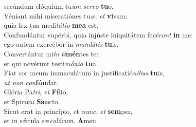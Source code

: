 \evenverse secúndum elóquium tu\textit{um} \textit{ser}\textit{vo} \textbf{tu}o.\\
\oddverse Véniant mihi miseratiónes tu\textit{æ}, \textit{et} \textbf{vi}vam:~\*\\
\oddverse quia lex tua medi\textit{tá}\textit{ti}\textit{o} \textbf{me}\textbf{a} est.\\
\evenverse Confundántur supérbi, quia injúste iniquitátem fe\textit{cé}\textit{runt} \textbf{in} me:~\*\\
\evenverse ego autem exercébor in \textit{man}\textit{dá}\textit{tis} \textbf{tu}is.\\
\oddverse Convertántur mi\textit{hi} \textit{ti}\textbf{mén}tes te:~\*\\
\oddverse et qui novérunt testi\textit{mó}\textit{ni}\textit{a} \textbf{tu}a.\\
\evenverse Fiat cor meum immaculátum in justificatió\textit{ni}\textit{bus} \textbf{tu}is,~\*\\
\evenverse \textit{ut} \textit{non} \textit{con}\textbf{fún}dar.\\
\oddverse Glória Pa\textit{tri}, \textit{et} \textbf{Fí}lio,~\*\\
\oddverse et Spi\textit{rí}\textit{tu}\textit{i} \textbf{San}cto.\\
\evenverse Sicut erat in princípio, et \textit{nunc}, \textit{et} \textbf{sem}per,~\*\\
\evenverse et in sǽcula sæ\textit{cu}\textit{ló}\textit{rum}. \textbf{A}men.\\
